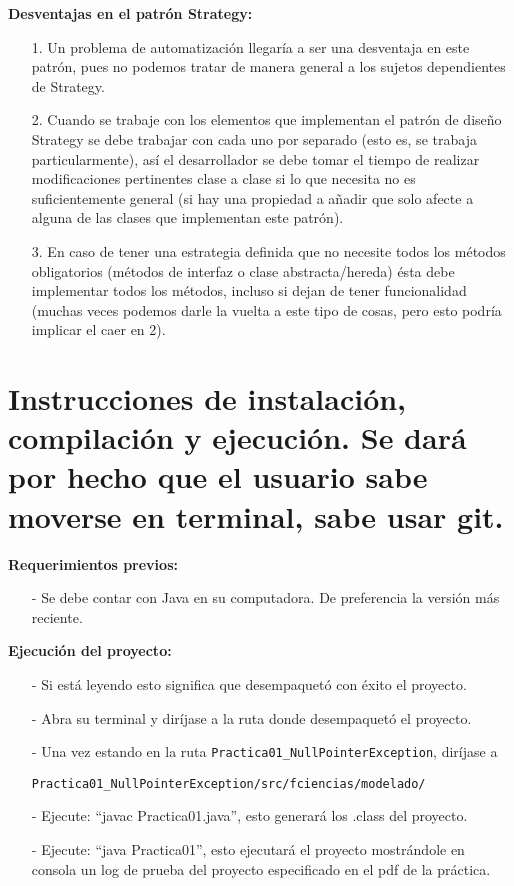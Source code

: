 \documentclass{article}
\newcommand{\code}[1]{\textcolor{white!25!black}{\texttt{#1}}}
\begin{document}
\textbf{Desventajas en el patrón Strategy:}
\begin{itemize}
\item[1.] Un problema de automatización llegaría a ser una desventaja en este patrón, pues no podemos tratar de manera general a los sujetos dependientes de Strategy.
\item[2.] Cuando se trabaje con los elementos que implementan el patrón de diseño Strategy se debe trabajar con cada uno por separado (esto es, se trabaja particularmente), así el desarrollador se debe tomar el tiempo de realizar modificaciones pertinentes clase a clase si lo que necesita no es suficientemente general (si hay una propiedad a añadir que solo afecte a alguna de las clases que implementan este patrón).
\item[3.] En caso de tener una estrategia definida que no necesite todos los métodos obligatorios (métodos de interfaz o clase abstracta/hereda) ésta debe implementar todos los métodos, incluso si dejan de tener funcionalidad (muchas veces podemos darle la vuelta a este tipo de cosas, pero esto podría implicar el caer en 2).
\end{itemize}

\section*{Instrucciones de instalación, compilación y ejecución. Se dará por hecho que el usuario sabe moverse en terminal, sabe usar git.}

\textbf{Requerimientos previos:}
\begin{itemize}
\item[-] Se debe contar con Java en su computadora. De preferencia la versión más reciente.
\end{itemize}

\textbf{Ejecución del proyecto:}
\begin{itemize}
\item[-] Si está leyendo esto significa que desempaquetó con éxito el proyecto.
\item[-] Abra su terminal y diríjase a la ruta donde desempaquetó el proyecto.
\item[-] Una vez estando en la ruta \code{Practica01\_NullPointerException}, diríjase a

  \code{Practica01\_NullPointerException/src/fciencias/modelado/}
\item[-] Ejecute: “javac Practica01.java”, esto generará los .class del proyecto.
\item[-] Ejecute: “java Practica01”, esto ejecutará el proyecto mostrándole
 en consola un log de prueba del proyecto especificado en el pdf de la práctica.
\end{itemize}
\end{document}
